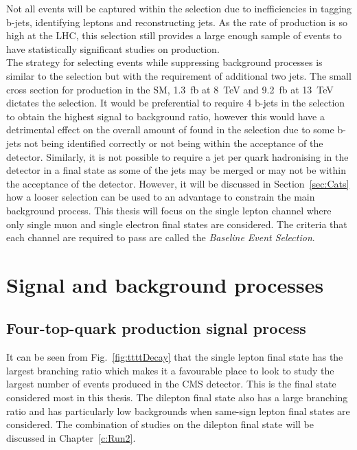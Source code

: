 Not all \ttbar events will be captured within the selection due to inefficiencies in tagging b-jets, identifying leptons and reconstructing jets. As the rate of \ttbar production is so high at the LHC, this selection still provides a large enough sample of events to have statistically significant studies on \ttbar production.\\

The strategy for selecting \tttt events while suppressing background processes is similar to the \ttbar selection but with the requirement of additional two jets. The small cross section for \tttt production in the SM, 1.3~fb at 8~TeV and 9.2~fb at 13~TeV~\cite{Alwall2014,Bevilacqua2012} dictates the selection. It would be preferential to require 4 b-jets in the selection to obtain the highest signal to background ratio, however this would have a detrimental effect on the overall amount of \tttt found in the selection due to some b-jets not being identified correctly or not being within the acceptance of the detector. Similarly, it is not possible to require a jet per quark hadronising in the detector in a \tttt final state as some of the jets may be merged or may not be within the acceptance of the detector. However, it will be discussed in Section~\ref{sec:Cats} how a looser selection can be used to an advantage to constrain the main background process.
This thesis will focus on the single lepton channel where only single muon and single electron final states are considered. 
The criteria that each channel are required to pass are called the \emph{Baseline Event Selection}.



\section{Signal and background processes}
\label{sec:sigback}

\subsection{Four-top-quark production signal process}
It can be seen from Fig.~\ref{fig:ttttDecay} that the single lepton final state has the largest branching ratio which makes it a favourable place to look to study the largest number of events produced in the CMS detector. This is the final state considered most in this thesis. The dilepton final state also has a large branching ratio and has particularly low backgrounds when same-sign lepton final states are considered. The combination of studies on the dilepton final state will be discussed in Chapter~\ref{c:Run2}.

